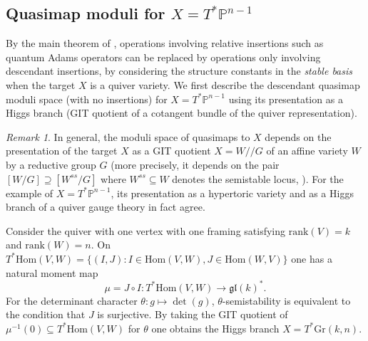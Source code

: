 \documentclass[reqno]{amsart}
\numberwithin{equation}{section}
\numberwithin{equation}{section}
\numberwithin{equation}{section}
\theoremstyle{definition}
\theoremstyle{remark}
\theoremstyle{remark}
\newtheorem{rem}[thm]{Remark}
\begin{document}
\subsection{Quasimap moduli for $X = T^*{\mathbb{P}^{n-1}}$}

By the main theorem of \cite{aganagic-okounkov-bethe}, operations involving relative insertions such as quantum Adams operators can be replaced by operations only involving descendant insertions, by considering the structure constants in the \emph{stable basis} when the target $X$ is a quiver variety. We first describe the descendant quasimap moduli space (with no insertions) for $X = T^*\mathbb{P}^{n-1}$ using its presentation as a Higgs branch (GIT quotient of a cotangent bundle of the quiver representation).

\begin{rem}
    In general, the moduli space of quasimaps to $X$ depends on the presentation of the target $X$ as a GIT quotient $X = W/\!\!/ G$ of an affine variety $W$ by a reductive group $G$ (more precisely, it depends on the pair $[W/G] \supseteq [W^{ss}/G]$ where $W^{ss} \subseteq W$ denotes the semistable locus, \cite[Proposition 4.6.1]{quasi-map}). For the example of $X = T^*{\mathbb{P}^{n-1}}$, its presentation as a hypertoric variety and as a Higgs branch of a quiver gauge theory in fact agree.
\end{rem}

Consider the quiver with one vertex with one framing satisfying $\mathrm{rank}(V) = k$ and $\mathrm{rank}(W) = n$. On $T^* \mathrm{Hom}(V, W) = \{(I, J) : I \in \mathrm{Hom}(V, W), J \in \mathrm{Hom}(W, V)\}$ one has a natural moment map 
\begin{equation}
\mu = J \circ I : T^*{\mathrm{Hom}(V,W)} \to  \mathfrak{gl}(k)^*. 
\end{equation}
For the determinant character $\theta : g \mapsto \det(g)$, $\theta$-semistability is equivalent to the condition that $J$ is surjective. By taking the GIT quotient of $\mu^{-1}(0) \subseteq T^*\mathrm{Hom}(V,W)$ for $\theta$ one obtains the Higgs branch $X = T^*\mathrm{Gr}(k,n)$.
\end{document}
